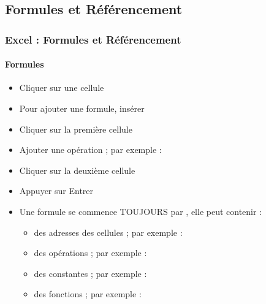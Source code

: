 \documentclass[xcolor=table, usenames,dvipsnames]{beamer}
\begin{document}
\subsection{Formules et Référencement}

\begin{frame}
\frametitle{Excel : Formules et Référencement}
\framesubtitle{Formules}

\begin{minipage}{0.60\textwidth}
	\begin{itemize}
		\item Cliquer sur une cellule 
		\item Pour ajouter une formule, insérer \keyword{=}
		\item Cliquer sur la première cellule 
		\item Ajouter une opération ; par exemple : \expword{+}
		\item Cliquer sur la deuxième cellule 
		\item Appuyer sur Entrer
	\end{itemize}
\end{minipage}
%
\begin{minipage}{0.39\textwidth}
\end{minipage}

\begin{itemize}
	\item Une formule se commence TOUJOURS par \keyword{=}, elle peut contenir :
	\begin{itemize}
		\item des adresses des cellules ; par exemple : 
		\item des opérations ; par exemple : \expword{+}
		\item des constantes ; par exemple : 
		\item des fonctions ; par exemple :  
	\end{itemize}
\end{itemize}

\end{frame}
\end{document}
